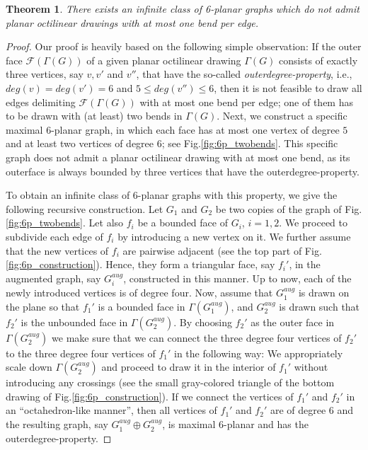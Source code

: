 \documentclass[a4paper,twoside,11pt]{article}
\newtheorem{theorem}{Theorem}
\begin{document}
\begin{theorem}
There exists an infinite class of 6-planar graphs which do not admit
planar octilinear drawings with at most one bend per edge.
\label{thm:6planar}
\end{theorem}
\begin{proof}
Our proof is heavily based on the following simple observation: If
the outer face $\mathcal{F}(\Gamma(G))$ of a given planar octilinear
drawing $\Gamma(G)$ consists of exactly three vertices, say $v,v'$
and $v''$, that have the so-called \emph{outerdegree-property},
i.e., $deg(v) = deg(v') = 6$ and $5 \leq deg(v'') \leq 6$, then it
is not feasible to draw all edges delimiting
$\mathcal{F}(\Gamma(G))$ with at most one bend per edge; one of them 
has to be drawn with (at least) two bends in $\Gamma(G)$. Next, we
construct a specific maximal 6-planar graph, in which each face has
at most one vertex of degree $5$ and at least two vertices of degree
$6$; see Fig.\ref{fig:6p_twobends}. This specific graph does not
admit a planar octilinear drawing with at most one bend, as its
outerface is always bounded by three vertices that have the
outerdegree-property.

To obtain an infinite class of 6-planar graphs with this property,
we give the following recursive construction. Let $G_1$ and $G_2$ be
two copies of the graph of Fig.\ref{fig:6p_twobends}. Let also $f_i$
be a bounded face of $G_i$, $i=1,2$. We proceed to subdivide each
edge of $f_i$ by introducing a new vertex on it. We further assume
that the new vertices of $f_i$ are pairwise adjacent (see the top
part of Fig.\ref{fig:6p_construction}). Hence, they form a
triangular face, say $f_i'$, in the augmented graph, say
$G_i^{aug}$, constructed in this manner. Up to now, each of the
newly introduced vertices is of degree four. Now, assume that
$G_1^{aug}$ is drawn on the plane so that $f_1'$ is a bounded face
in $\Gamma(G_1^{aug})$, and $G_2^{aug}$ is drawn such that $f_2'$ is
the unbounded face in $\Gamma(G_2^{aug})$. By choosing $f_2'$ as the
outer face in $\Gamma(G_2^{aug})$ we make sure that we can connect
the three degree four vertices of $f_2'$ to the three degree four
vertices of $f_1'$ in the following way: We appropriately scale down
$\Gamma(G_2^{aug})$ and proceed to draw it in the interior of $f_1'$
without introducing any crossings (see the small gray-colored
triangle of the bottom drawing of Fig.\ref{fig:6p_construction}). If
we connect the vertices of $f_1'$ and $f_2'$ in an ``octahedron-like
manner'', then all vertices of $f_1'$ and $f_2'$ are of degree $6$
and the resulting graph, say $G_1^{aug} \oplus G_2^{aug}$, is
maximal $6$-planar and has the outerdegree-property.
\end{proof}
\end{document}

